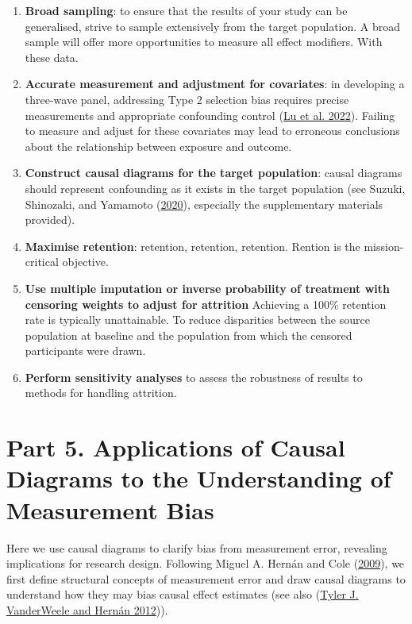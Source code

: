 \documentclass[
  singlecolumn]{report}
\begin{document}
\begin{enumerate}
\def\labelenumi{\arabic{enumi}.}
\item
  \textbf{Broad sampling}: to ensure that the results of your study can
  be generalised, strive to sample extensively from the target
  population. A broad sample will offer more opportunities to measure
  all effect modifiers. With these data.
\item
  \textbf{Accurate measurement and adjustment for covariates}: in
  developing a three-wave panel, addressing Type 2 selection bias
  requires precise measurements and appropriate confounding control
  (\protect\hyperlink{ref-lu2022}{Lu et al. 2022}). Failing to measure
  and adjust for these covariates may lead to erroneous conclusions
  about the relationship between exposure and outcome.
\item
  \textbf{Construct causal diagrams for the target population}: causal
  diagrams should represent confounding as it exists in the target
  population (see Suzuki, Shinozaki, and Yamamoto
  (\protect\hyperlink{ref-suzuki2020}{2020}), especially the
  supplementary materials provided).
\item
  \textbf{Maximise retention}: retention, retention, retention. Rention
  is the mission-critical objective.
\item
  \textbf{Use multiple imputation or inverse probability of treatment
  with censoring weights to adjust for attrition} Achieving a 100\%
  retention rate is typically unattainable. To reduce disparities
  between the source population at baseline and the population from
  which the censored participants were drawn.
\item
  \textbf{Perform sensitivity analyses} to assess the robustness of
  results to methods for handling attrition.
\end{enumerate}

\hypertarget{part-5.-applications-of-causal-diagrams-to-the-understanding-of-measurement-bias}{%
\section{Part 5. Applications of Causal Diagrams to the Understanding of
Measurement
Bias}\label{part-5.-applications-of-causal-diagrams-to-the-understanding-of-measurement-bias}}

Here we use causal diagrams to clarify bias from measurement error,
revealing implications for research design. Following Miguel A. Hernán
and Cole (\protect\hyperlink{ref-hernuxe1n2009}{2009}), we first define
structural concepts of measurement error and draw causal diagrams to
understand how they may bias causal effect estimates (see also
(\protect\hyperlink{ref-vanderweele2012}{Tyler J. VanderWeele and Hernán
2012})).
\end{document}
